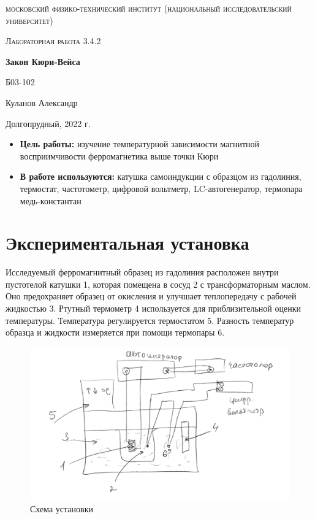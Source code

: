 \documentclass[a4paper, 12pt]{article}
\begin{document}
\begin{titlepage}
	\centering
	\vspace{5cm}
	{\scshape\LARGE московский физико-технический институт (национальный исследовательский университет) \par}
	\vspace{6cm}
	{\scshape\Large Лабораторная работа 3.4.2 \par}
	{\huge\bfseries Закон Кюри-Вейса \par}
	\vspace{1cm}
	\vfill
\begin{flushright}
	{\large Б03-102}\par
	\vspace{0.3cm}
	{\LARGE Куланов Александр}
\end{flushright}
	

	\vfill


	Долгопрудный, 2022 г.
\end{titlepage}

\begin{itemize}
	\item \textbf{Цель работы:} изучение температурной зависимости магнитной восприимчивости ферромагнетика выше точки Кюри 
    \item \textbf{В работе используются:} катушка самоиндукции с образцом из гадолиния, термостат, 
	частотометр, цифровой вольтметр, LC-автогенератор, термопара медь-константан
    
\end{itemize}

\section{Экспериментальная установка}

Исследуемый ферромагнитный образец из гадолиния расположен внутри пустотелой катушки 1, 
которая помещена в сосуд 2 с трансформаторным маслом. Оно предохраняет образец от окисления 
и улучшает теплопередачу с рабочей жидкостью 3. Ртутный термометр 4 используется для 
приблизительной оценки температуры. Температура регулируется термостатом 5. Разность 
температур образца и жидкости измеряется при помощи термопары 6.

\begin{figure}[h]
    \centering
    \includegraphics[width=1\textwidth]{set}
    \caption{Схема установки}
    \label{fig:set}
\end{figure}
\end{document}
